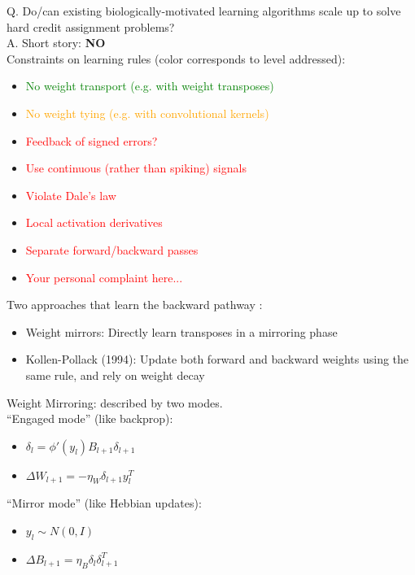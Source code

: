 \documentclass[12pt]{article}
\begin{document}
Q. Do/can existing biologically-motivated learning algorithms scale up to solve hard credit assignment problems? \\

A. Short story: \textbf{NO} \cite{Bartunov18} \\

Constraints on learning rules (color corresponds to level addressed):
\begin{itemize}
    \item \textcolor{green}{No weight transport (e.g. with weight transposes)}
    \item \textcolor{orange}{No weight tying (e.g. with convolutional kernels)}
    \item \textcolor{red}{Feedback of signed errors?}
    \item \textcolor{red}{Use continuous (rather than spiking) signals}
    \item \textcolor{red}{Violate Dale's law}
    \item \textcolor{red}{Local activation derivatives}
    \item \textcolor{red}{Separate forward/backward passes}
    \item \textcolor{red}{Your personal complaint here...}
\end{itemize}

Two approaches that learn the backward pathway \cite{Akrout19}: 
\begin{itemize}
    \item Weight mirrors: Directly learn transposes in a mirroring phase
    \item Kollen-Pollack (1994): Update both forward and backward weights using the same rule, and rely on weight decay
\end{itemize}

Weight Mirroring: described by two modes. \\

``Engaged mode'' (like backprop):
\begin{itemize}
    \item $\delta_l = \phi'(y_l)B_{l+1}\delta_{l+1}$
    \item $\Delta W_{l+1} = -\eta_W \delta_{l+1}y_l^T$
\end{itemize}
``Mirror mode'' (like Hebbian updates):
\begin{itemize}
    \item $y_l \sim N(0,I)$
    \item $\Delta B_{l+1} = \eta_B \delta_l \delta_{l+1}^T$
\end{itemize}
\end{document}

